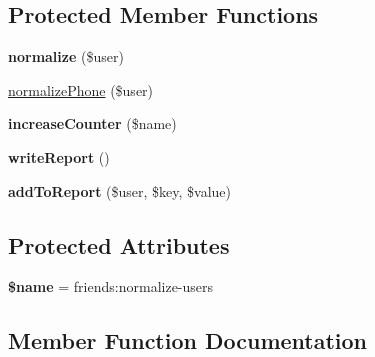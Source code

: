 \subsection*{Protected Member Functions}
\begin{DoxyCompactItemize}
\item 
\hypertarget{classDMA_1_1Friends_1_1Commands_1_1NormalizeUserData_a1078b99623707b6392b0d791f8729cb8}{}{\bfseries normalize} (\$user)\label{classDMA_1_1Friends_1_1Commands_1_1NormalizeUserData_a1078b99623707b6392b0d791f8729cb8}

\item 
\hyperlink{classDMA_1_1Friends_1_1Commands_1_1NormalizeUserData_a19288b02592b7e02e667651f3de20d2a}{normalize\+Phone} (\$user)
\item 
\hypertarget{classDMA_1_1Friends_1_1Commands_1_1NormalizeUserData_a461a7984a9cd1ab0f7c5bc6be0edf90c}{}{\bfseries increase\+Counter} (\$name)\label{classDMA_1_1Friends_1_1Commands_1_1NormalizeUserData_a461a7984a9cd1ab0f7c5bc6be0edf90c}

\item 
\hypertarget{classDMA_1_1Friends_1_1Commands_1_1NormalizeUserData_a4c66677355e7e5f797dd7bc296c46584}{}{\bfseries write\+Report} ()\label{classDMA_1_1Friends_1_1Commands_1_1NormalizeUserData_a4c66677355e7e5f797dd7bc296c46584}

\item 
\hypertarget{classDMA_1_1Friends_1_1Commands_1_1NormalizeUserData_a9c10e6d3ea1320d5aef15ddba36b325f}{}{\bfseries add\+To\+Report} (\$user, \$key, \$value)\label{classDMA_1_1Friends_1_1Commands_1_1NormalizeUserData_a9c10e6d3ea1320d5aef15ddba36b325f}

\end{DoxyCompactItemize}
\subsection*{Protected Attributes}
\begin{DoxyCompactItemize}
\item 
\hypertarget{classDMA_1_1Friends_1_1Commands_1_1NormalizeUserData_ad3564233e0bfca05feada7e6ff525aca}{}{\bfseries \$name} = \textquotesingle{}friends\+:normalize-\/users\textquotesingle{}\label{classDMA_1_1Friends_1_1Commands_1_1NormalizeUserData_ad3564233e0bfca05feada7e6ff525aca}

\end{DoxyCompactItemize}


\subsection{Member Function Documentation}
\hypertarget{classDMA_1_1Friends_1_1Commands_1_1NormalizeUserData_abb6a366bfe6d71d57c38eac99befc8f6}{}
